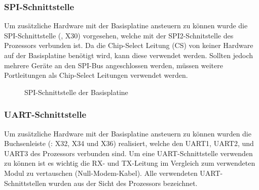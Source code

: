 \subsubsection{SPI-Schnittstelle}
Um zusätzliche Hardware mit der \gls{Basisplatine} ansteuern zu können wurde die SPI-Schnittstelle (, X30) vorgesehen, welche mit der SPI2-Schnitstelle des Prozessors verbunden ist. Da die Chip-Select Leitung (CS) von keiner Hardware auf der Basisplatine benötigt wird, kann diese verwendet werden. Sollten jedoch mehrere Geräte an den SPI-Bus angeschlossen werden, müssen weitere Portleitungen als Chip-Select Leitungen verwendet werden.

\begin{figure}[htb]
    \centering
    \qquad
    \qquad
    \caption[SPI-Schnittstelle der Basisplatine]{SPI-Schnittstelle der \gls{Basisplatine}}
    \label{fig:basisplatine-spi}
\end{figure}

\subsubsection{UART-Schnittstelle}
Um zusätzliche Hardware mit der \gls{Basisplatine} ansteuern zu können wurden die Buchsenleiste (: X32, X34 und X36) realisiert, welche den UART1, UART2, und UART3 des Prozessors verbunden sind. Um eine UART-Schnittstelle verwenden zu können ist es wichtig die RX- und TX-Leitung im Vergleich zum verwendeten Modul zu vertauschen (Null-Modem-Kabel). Alle verwendeten UART-Schnittstellen wurden aus der Sicht des Prozessors bezeichnet.

